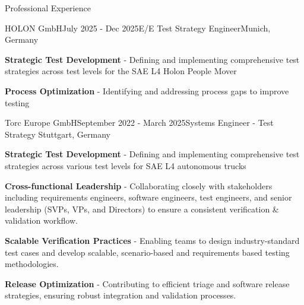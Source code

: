 \documentclass{resume} %
\begin{document}
	\begin{rSection}{Professional Experience}
			\vspace{2mm}
	\begin{rSubsection}{HOLON GmbH}{July 2025 - Dec 2025}{E/E Test Strategy Engineer}{Munich, Germany}
		\fontsize{10pt}{12pt}\selectfont
		\item \textbf{Strategic Test Development} - Defining and implementing comprehensive test strategies across test levels for the SAE L4 Holon People Mover
		\item \textbf{Process Optimization} - Identifying and addressing process gaps to improve testing 
	\end{rSubsection}
		\begin{rSubsection}{Torc Europe GmbH}{September 2022 - March 2025}{Systems Engineer - Test Strategy }{Stuttgart, Germany}
				\fontsize{10pt}{12pt}\selectfont
			\item \textbf{Strategic Test Development} - Defining and implementing comprehensive test strategies across various test levels for SAE L4 autonomous trucks
			\item \textbf{Cross-functional Leadership} - Collaborating closely with stakeholders including requirements engineers, software engineers, test engineers, and senior leadership (SVPs, VPs, and Directors) to ensure a consistent verification \& validation workflow.
			\item \textbf{Scalable Verification Practices} - Enabling teams to design industry-standard test cases and develop scalable, scenario-based and requirements based testing methodologies.
			\item \textbf{Release Optimization} -  Contributing to efficient triage and software release strategies, ensuring robust integration and validation processes.
		\end{rSubsection}
				

\end{rSection}
\end{document}
